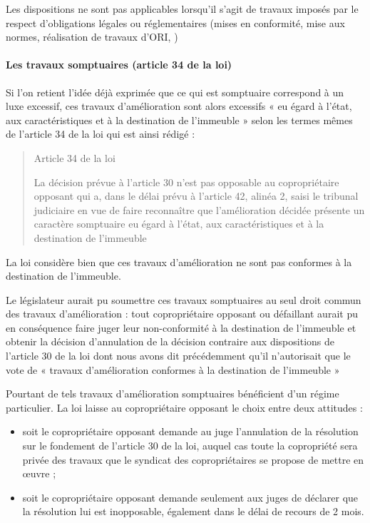 				Les dispositions ne sont pas applicables lorsqu'il s'agit de travaux imposés par le respect d'obligations légales ou réglementaires (mises en conformité, mise aux normes, réalisation de travaux d’ORI, \etc)
			
			\paragraph{Les travaux somptuaires (article 34 de la loi)}
			
				Si l'on retient l’idée déjà exprimée que ce qui est somptuaire correspond à un luxe excessif, ces travaux d'amélioration sont alors excessifs « eu égard à l'état, aux caractéristiques et à la destination de l'immeuble » selon les termes mêmes de l'article 34 de la loi qui est ainsi rédigé :
				\begin{quote}
					Article 34 de la loi
					
					La décision prévue à l'article 30 n'est pas opposable au copropriétaire opposant qui a, dans le délai prévu à l'article 42, alinéa 2, saisi le tribunal judiciaire en vue de faire reconnaître que l'amélioration décidée présente un caractère somptuaire eu égard à l'état, aux caractéristiques et à la destination de l'immeuble
				\end{quote}
				
				La loi considère bien que ces travaux d'amélioration ne sont pas conformes à la destination de l'immeuble.
				
				Le législateur aurait pu soumettre ces travaux somptuaires au seul droit commun des travaux d'amélioration : tout copropriétaire opposant ou défaillant aurait pu en conséquence faire juger leur non-conformité à la destination de l’immeuble et obtenir la décision d'annulation de la décision contraire aux dispositions de l’article 30 de la loi dont nous avons dit précédemment qu'il n'autorisait que le vote de « travaux d'amélioration conformes à la destination de l’immeuble »
				
				Pourtant de tels travaux d'amélioration somptuaires bénéficient d'un régime particulier. La loi laisse au copropriétaire opposant le choix entre deux attitudes :
				\begin{itemize}
					\item soit le copropriétaire opposant demande au juge l’annulation de la résolution sur le fondement de l'article 30 de la loi, auquel cas toute la copropriété sera privée des travaux que le syndicat des copropriétaires se propose de mettre en œuvre ;
					\item soit le copropriétaire opposant demande seulement aux juges de déclarer que la résolution lui est inopposable, également dans le délai de recours de 2 mois.
				\end{itemize}
				
